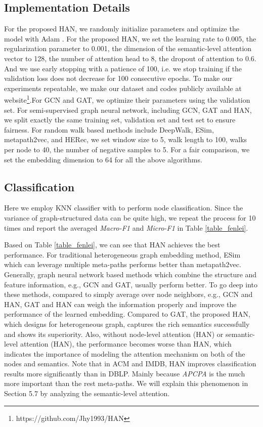 \subsection{Implementation Details}
For the proposed HAN, we 
randomly initialize parameters
and optimize the 
model with Adam
\cite{adam}.
For the proposed HAN, we set the learning rate to 0.005, 
the regularization parameter to 0.001, the dimension of the semantic-level attention vector  to 128, the number of attention head  to 8, the dropout of attention to 0.6.
And we use early stopping with a patience of 100, i.e. we stop training if the validation loss does not decrease for 100 consecutive epochs. To make our experiments repeatable, we make our dataset and codes publicly available at website\footnote{https://github.com/Jhy1993/HAN}.For GCN and GAT, we optimize their parameters using the validation set. 
For semi-supervised graph neural network, including GCN, GAT and HAN, we split exactly the same training set, validation set and test set to ensure fairness.
For random walk based methods include DeepWalk, ESim, metapath2vec, and HERec, 
we set window size to 5, walk length to 100, 
walks per node to 40, the number of negative samples to 5. For a fair comparison, we set the embedding dimension to 64 for all the above algorithms. 



\subsection{Classification}
Here we employ 
KNN classifier with  to perform node classification. 
Since the variance of graph-structured data can be quite high, we repeat the process for 10 times and report the averaged \emph{Macro-F1} and \emph{Micro-F1} in Table \ref{table_fenlei}. 

Based on Table \ref{table_fenlei}, we can see that HAN achieves the best performance. 
For traditional heterogeneous graph embedding method, ESim which can leverage multiple meta-paths performs better than metapath2vec.
Generally, graph neural network based methods which combine the structure and feature information, e.g., GCN and GAT, usually perform better. 
To go deep into these methods, compared to simply average over node neighbors, e.g., GCN and HAN, 
GAT and HAN can weigh the information properly and improve the performance of the learned embedding. 
Compared to GAT, the proposed HAN, which designs for heterogeneous graph, captures the rich semantics successfully and shows its superiority.
Also, without node-level attention (HAN) or semantic-level attention (HAN), 
the performance becomes worse than HAN, which indicates the importance of modeling the attention mechanism on both of the nodes and semantics. Note that in ACM and IMDB, HAN improves classification results more significantly than in DBLP. Mainly because \emph{APCPA} is the much more important than the rest meta-paths.
We will explain this phenomenon in Section 5.7 by analyzing the semantic-level attention.


